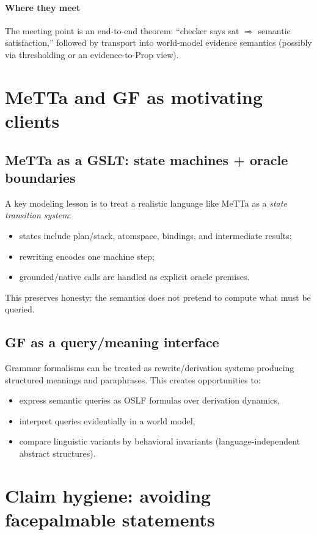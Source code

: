 \documentclass[11pt]{article}
\theoremstyle{definition}
\begin{document}
\paragraph{Where they meet}
The meeting point is an end-to-end theorem: ``checker says \textsf{sat} $\Rightarrow$ semantic satisfaction,''
followed by transport into world-model evidence semantics (possibly via thresholding or an evidence-to-Prop view).

\section{MeTTa and GF as motivating clients}

\subsection{MeTTa as a GSLT: state machines + oracle boundaries}

A key modeling lesson is to treat a realistic language like MeTTa as a \emph{state transition system}:
\begin{itemize}[leftmargin=1.5em]
\item states include plan/stack, atomspace, bindings, and intermediate results;
\item rewriting encodes one machine step;
\item grounded/native calls are handled as explicit oracle premises.
\end{itemize}
This preserves honesty: the semantics does not pretend to compute what must be queried.

\subsection{GF as a query/meaning interface}

Grammar formalisms can be treated as rewrite/derivation systems producing structured meanings and paraphrases.
This creates opportunities to:
\begin{itemize}[leftmargin=1.5em]
\item express semantic queries as OSLF formulas over derivation dynamics,
\item interpret queries evidentially in a world model,
\item compare linguistic variants by behavioral invariants (language-independent abstract structures).
\end{itemize}

\section{Claim hygiene: avoiding facepalmable statements}
\end{document}

